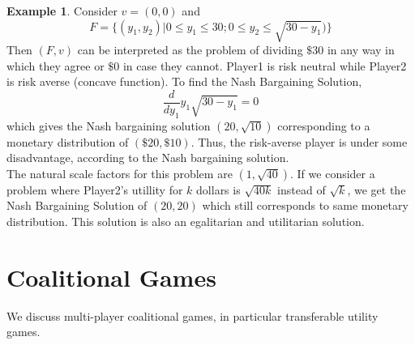 \documentclass{article}
\theoremstyle{definition}
\newtheorem{example}{Example}[section]
\begin{document}
\begin{example} 
Consider $v = (0,0)$ and $$F = \{(y_1,y_2)|0\leq y_1\leq 30; 0\leq y_2 \leq \sqrt{30- y_1})\}$$ Then $(F,v)$ can be interpreted as the problem of dividing $\$30$ in any way in which they agree or $\$0$ in case they cannot. Player1 is risk neutral while Player2 is risk averse (concave function). To find the Nash Bargaining Solution, $$\frac{d}{dy_1} y_1\sqrt{30-y_1} = 0$$ which gives the Nash bargaining solution $(20,\sqrt{10})$ corresponding to a monetary distribution of $(\$20,\$10)$. Thus, the risk-averse player is under some disadvantage, according to the Nash bargaining solution.\\
The natural scale factors for this problem are $(1,\sqrt{40})$. If we consider a problem where Player2's utillity for $k$ dollars is $\sqrt{40k}$ instead of $\sqrt{k}$, we get the Nash Bargaining Solution of $(20,20)$ which still corresponds to same monetary distribution. This solution is also an egalitarian and utilitarian solution.
\end{example}
\section{Coalitional Games}
We discuss multi-player coalitional games, in particular transferable utility games.
\end{document}
